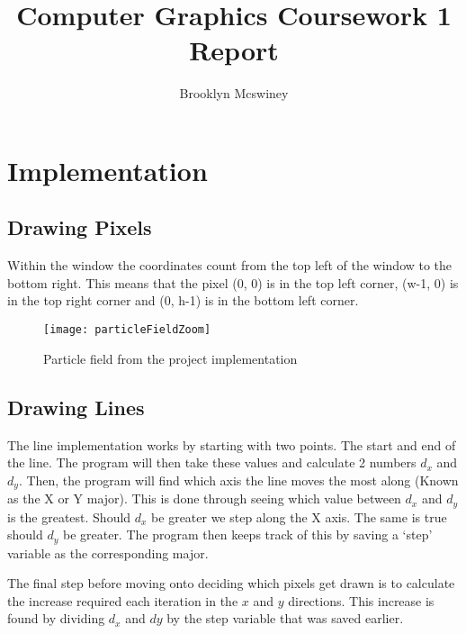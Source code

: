 \documentclass[
	letterpaper, %
	10pt, %
]{CSUniSchoolLabReport}
\title{Computer Graphics Coursework 1 Report} %
\author{Brooklyn Mcswiney} %
\date{ }
\begin{document}
\maketitle %

\pagebreak

\tableofcontents

\pagebreak

\section{Implementation}

\subsection{Drawing Pixels}

Within the window the coordinates count from the top left of the window
to the bottom right. This means that the pixel (0, 0) is in the top left
corner, (w-1, 0) is in the top right corner and (0, h-1) is in the 
bottom left corner.

\begin{figure}[h]
	\centering
	\texttt{[image: particleFieldZoom]}
	\caption{Particle field from the project implementation}
\end{figure}

\subsection{Drawing Lines}
\begin{flushleft}
	The line implementation works by starting with two points. The start and
	end of the line. The program will then take these values and calculate 2
	numbers \(d_x\) and \( d_y\). Then, the program will find which axis the
	line moves the most along (Known as the X or Y major). This is done through
	seeing which value between \(d_x\) and \( d_y\) is the greatest. Should \(d_x\)
	be greater we step along the X axis. The same is true should \(d_y\) be greater.
	The program then keeps track of this by saving a `step' variable as the corresponding 
	major.
\end{flushleft}

\begin{flushleft}
	The final step before moving onto deciding which pixels get drawn is to calculate
	the increase required each iteration in the \(x\) and \(y\) directions.
	This increase is found by dividing \(d_x\) and \(dy\) by the step variable that was
	saved earlier. 
\end{flushleft}
\end{document}
